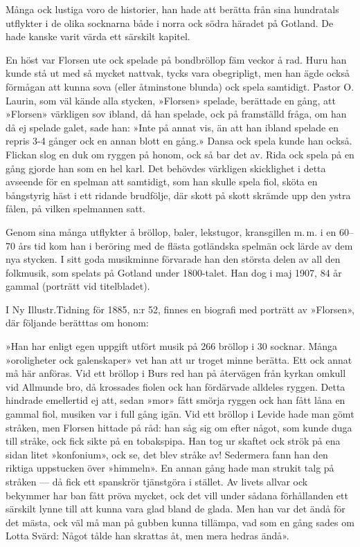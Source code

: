 Många ock lustiga voro de historier, han hade att berätta från sina hundratals utflykter i de olika socknarna både i norra ock södra häradet på Gotland. De hade kanske varit värda ett särskilt kapitel. 

En höst var Florsen ute ock spelade på bondbröllop fäm veckor å rad. Huru han kunde stå ut med så mycket nattvak, tycks vara obegripligt, men han ägde också förmågan att kunna sova (eller åtminstone blunda) ock spela samtidigt. Pastor O. Laurin, som väl kände alla stycken, »Florsen» spelade, berättade en gång, att »Florsen» värkligen sov ibland, då han spelade, ock på framställd fråga, om han då ej spelade galet, sade han: »Inte på annat vis, än att han ibland spelade en repris 3-4 gånger ock en annan blott en gång.» Dansa ock spela kunde han också. Flickan slog en duk om ryggen på honom, ock så bar det av. Rida ock spela på en gång gjorde han som en hel karl. Det behövdes värkligen skicklighet i detta avseende för en spelman att samtidigt, som han skulle spela fiol, sköta en bångstyrig häst i ett ridande brudfölje, där skott på skott skrämde upp den ystra fålen, på vilken spelmannen satt. 

Genom sina många utflykter å bröllop, baler, lekstugor, kransgillen m.\,m. i en 60--70 års tid kom han i beröring med de flästa gotländska spelmän ock lärde av dem nya stycken. I sitt goda musikminne förvarade han den största delen av all den folkmusik, som spelats på Gotland under 1800-talet. Han dog i maj 1907, 84 år gammal (porträtt vid titelbladet). 

I Ny Illustr.\@ Tidning för 1885, n:r 52, finnes en biografi med porträtt av »Florsen», där följande berätttas om honom: 

»Han har enligt egen uppgift utfört musik på 266 bröllop i 30 socknar. Många »oroligheter ock galenskaper» vet han att ur troget minne berätta. Ett ock annat må här anföras. Vid ett bröllop i Burs red han på återvägen från kyrkan omkull vid Allmunde bro, då krossades fiolen ock han fördärvade alldeles ryggen. Detta hindrade emellertid ej att, sedan »mor» fått smörja ryggen ock han fått låna en gammal fiol, musiken var i full gång igän. Vid ett bröllop i Levide hade man gömt stråken, men Florsen hittade på råd: han såg sig om efter något, som kunde duga till stråke, ock fick sikte på en tobakspipa. Han tog ur skaftet ock strök på ena sidan litet »konfonium», ock se, det blev stråke av! Sedermera fann han den riktiga uppstucken över »himmeln». En annan gång hade man strukit talg på stråken --- då fick ett spanskrör tjänstgöra i stället. Av livets allvar ock bekymmer har ban fått pröva mycket, ock det vill under sådana förhållanden ett särskilt lynne till att kunna vara glad bland de glada. Men han var det ändå för det mästa, ock väl må man på gubben kunna tillämpa, vad som en gång sades om Lotta Svärd: Något tålde han skrattas åt, men mera hedras ändå». 

